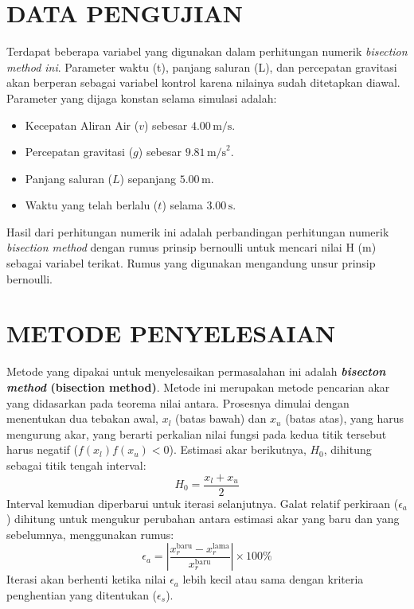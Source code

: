 \documentclass[conference]{IEEEtran}
\begin{document}
\section{DATA PENGUJIAN}
Terdapat beberapa variabel yang digunakan dalam perhitungan numerik \textit{bisection method ini}. Parameter waktu (t), panjang saluran (L), dan percepatan gravitasi akan berperan sebagai variabel kontrol karena nilainya sudah ditetapkan diawal. Parameter yang dijaga konstan selama simulasi adalah:
\begin{itemize}
    \item Kecepatan Aliran Air ($v$) sebesar $4.00 \, \text{m/s}$.
    \item Percepatan gravitasi ($g$) sebesar $9.81 \, \text{m/s}^2$.
    \item Panjang saluran ($L$) sepanjang $5.00 \, \text{m}$.
    \item Waktu yang telah berlalu ($t$) selama $3.00 \, \text{s}$.
\end{itemize}
Hasil dari perhitungan numerik ini adalah perbandingan perhitungan numerik \textit{bisection method} dengan rumus prinsip bernoulli untuk mencari nilai H (m) sebagai variabel terikat. Rumus yang digunakan mengandung unsur prinsip bernoulli. 

\section{METODE PENYELESAIAN}

Metode yang dipakai untuk menyelesaikan permasalahan ini adalah \textbf{\textit{bisecton method} (bisection method)}. Metode ini merupakan metode pencarian akar yang didasarkan pada teorema nilai antara. Prosesnya dimulai dengan menentukan dua tebakan awal, $x_l$ (batas bawah) dan $x_u$ (batas atas), yang harus mengurung akar, yang berarti perkalian nilai fungsi pada kedua titik tersebut harus negatif ($f(x_l)f(x_u) < 0$). Estimasi akar berikutnya, $H_0$, dihitung sebagai titik tengah interval:
\begin{equation}
    H_0 = \frac{x_l + x_u}{2}
\end{equation}
Interval kemudian diperbarui untuk iterasi selanjutnya. Galat relatif perkiraan ($\epsilon_a$) dihitung untuk mengukur perubahan antara estimasi akar yang baru dan yang sebelumnya, menggunakan rumus:
\begin{equation}
    \epsilon_a = \left|\frac{x_{r}^{\text{baru}} - x_{r}^{\text{lama}}}{x_{r}^{\text{baru}}}\right| \times 100\%
\end{equation} 
Iterasi akan berhenti ketika nilai $\epsilon_a$ lebih kecil atau sama dengan kriteria penghentian yang ditentukan ($\epsilon_s$).
\end{document}
